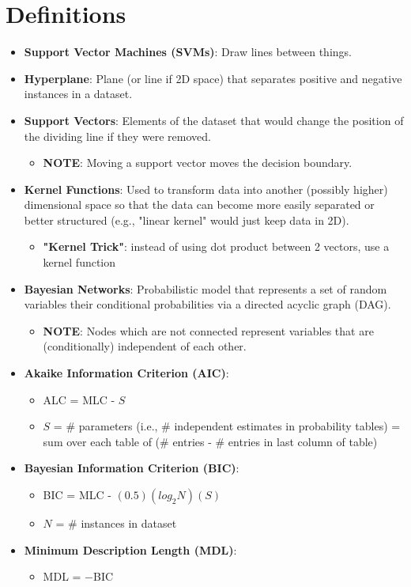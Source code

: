 \documentclass{article}
\begin{document}
\section{Definitions}

\begin{itemize}
	\item {\bf Support Vector Machines (SVMs)}: Draw lines between things.
	\item {\bf Hyperplane}: Plane (or line if 2D space) that separates positive and negative instances in a dataset.
	\item {\bf Support Vectors}: Elements of the dataset that would change the position of the dividing line if they were removed.
		\begin{itemize}
			\item {\bf NOTE}: Moving a support vector moves the decision boundary.
		\end{itemize} 
	\item {\bf Kernel Functions}: Used to transform data into another (possibly higher) dimensional space so that the data can become more easily separated or better structured (e.g., "linear kernel" would just keep data in 2D).
		\begin{itemize}
			\item {\bf "Kernel Trick"}: instead of using dot product between 2 vectors, use a kernel function
		\end{itemize}
	\item {\bf Bayesian Networks}: Probabilistic model that represents a set of random variables their conditional probabilities via a directed acyclic graph (DAG).
		\begin{itemize}
			\item {\bf NOTE}: Nodes which are not connected represent variables that are (conditionally) independent of each other.
		\end{itemize}
	\item {\bf Akaike Information Criterion (AIC)}:
		\begin{itemize}
			\item ALC = MLC - $S$
			\item $S$ = \# parameters (i.e., \# independent estimates in probability tables) = sum over each table of (\# entries - \# entries in last column of table)
		\end{itemize}
	\item {\bf Bayesian Information Criterion (BIC)}:
		\begin{itemize}
			\item BIC = MLC - $(0.5)(log_2 N)(S)$
			\item $N$ = \# instances in dataset
		\end{itemize}
	\item {\bf Minimum Description Length (MDL)}:
		\begin{itemize}
			\item MDL = $-$BIC
		\end{itemize}
\end{itemize}
\end{document}
